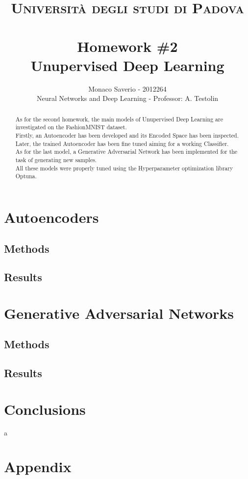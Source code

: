 \documentclass[11pt,a4paper,twocolumn]{IEEEtran}
\author{Monaco Saverio - 2012264 \sepline \\Neural Networks and Deep Learning - Professor: A. Testolin}
\title{{\normalsize\textsc{Università degli studi di Padova}}\vspace{-.5cm} \\ \sepline\\ \textbf{Homework \#2
\\ Unupervised Deep Learning}}
\begin{document}
	\maketitle
	\begin{abstract} As for the second homework, the main models of Unupervised Deep Learning are investigated on the FashionMNIST dataset.\\ 
	Firstly, an Autoencoder has been developed and its Encoded Space has been inspected. Later, the trained Autoencoder has been fine tuned aiming for a working Classifier.\\
	As for the last model, a Generative Adversarial Network has been implemented for the task of generating new samples.\\
	All these models were properly tuned using the Hyperparameter optimization library Optuna.
	\end{abstract}

	\section{\textbf{Autoencoders}}
		\subsection{\textbf{Methods}}
		\subsection{\textbf{Results}}
		
	\section{\textbf{Generative Adversarial Networks}}
		\subsection{\textbf{Methods}}
		\subsection{\textbf{Results}}
		
	\section{\textbf{Conclusions}}
	
	\newpage
	a
	\newpage
	\onecolumn
	\section{\textbf{Appendix}}
\end{document}
